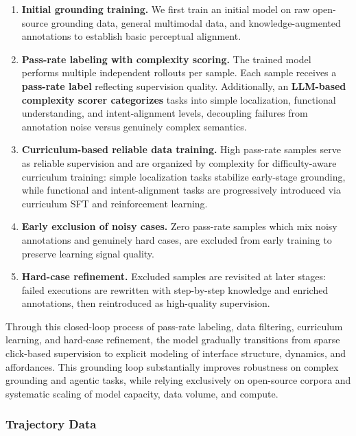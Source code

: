 \begin{enumerate}
    \item \textbf{Initial grounding training.}
    We first train an initial model on raw open-source grounding data, general multimodal data, and knowledge-augmented annotations to establish basic perceptual alignment.

    \item \textbf{Pass-rate labeling with complexity scoring.}
    The trained model performs multiple independent rollouts per sample. Each sample receives a \textbf{pass-rate label} reflecting supervision quality. Additionally, an \textbf{LLM-based complexity scorer categorizes} tasks into simple localization, functional understanding, and intent-alignment levels, decoupling failures from annotation noise versus genuinely complex semantics.

    \item \textbf{Curriculum-based reliable data training.}
    High pass-rate samples serve as reliable supervision and are organized by complexity for difficulty-aware curriculum training: simple localization tasks stabilize early-stage grounding, while functional and intent-alignment tasks are progressively introduced via curriculum SFT and reinforcement learning.

    \item \textbf{Early exclusion of noisy cases.}
    Zero pass-rate samples which mix noisy annotations and genuinely hard cases, are excluded from early training to preserve learning signal quality.

    \item \textbf{Hard-case refinement.}
    Excluded samples are revisited at later stages: failed executions are rewritten with step-by-step knowledge and enriched annotations, then reintroduced as high-quality supervision.
\end{enumerate}


Through this closed-loop process of pass-rate labeling, data filtering, curriculum learning, and hard-case refinement, the model gradually transitions from sparse click-based supervision to explicit modeling of interface structure, dynamics, and affordances. This grounding loop substantially improves robustness on complex grounding and agentic tasks, while relying exclusively on open-source corpora and systematic scaling of model capacity, data volume, and compute.


\subsubsection{Trajectory Data}

